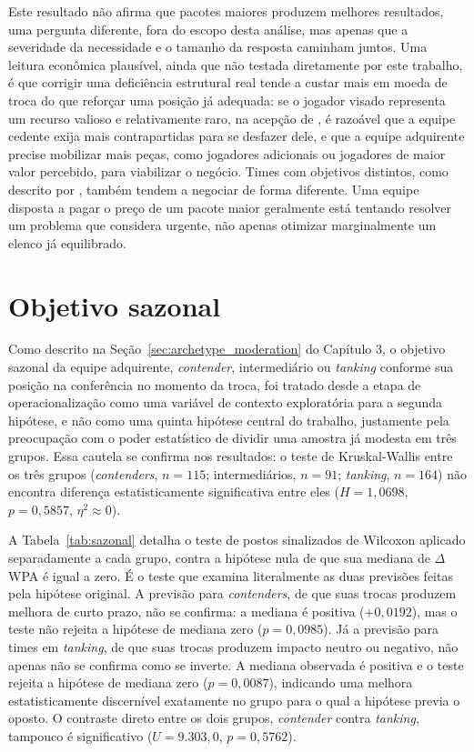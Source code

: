 Este resultado não afirma que pacotes maiores produzem melhores resultados, uma pergunta diferente, fora do escopo desta análise, mas apenas que a severidade da necessidade e o tamanho da resposta caminham juntos. Uma leitura econômica plausível, ainda que não testada diretamente por este trabalho, é que corrigir uma deficiência estrutural real tende a custar mais em moeda de troca do que reforçar uma posição já adequada: se o jogador visado representa um recurso valioso e relativamente raro, na acepção de \citet{barney1991}, é razoável que a equipe cedente exija mais contrapartidas para se desfazer dele, e que a equipe adquirente precise mobilizar mais peças, como jogadores adicionais ou jogadores de maior valor percebido, para viabilizar o negócio. Times com objetivos distintos, como descrito por \citet{zimbalist2003}, também tendem a negociar de forma diferente. Uma equipe disposta a pagar o preço de um pacote maior geralmente está tentando resolver um problema que considera urgente, não apenas otimizar marginalmente um elenco já equilibrado.

\section{Objetivo sazonal}
\label{sec:r_context}

Como descrito na Seção~\ref{sec:archetype_moderation} do Capítulo 3, o objetivo sazonal da equipe adquirente, \textit{contender}, intermediário ou \textit{tanking} conforme sua posição na conferência no momento da troca, foi tratado desde a etapa de operacionalização como uma variável de contexto exploratória para a segunda hipótese, e não como uma quinta hipótese central do trabalho, justamente pela preocupação com o poder estatístico de dividir uma amostra já modesta em três grupos. Essa cautela se confirma nos resultados: o teste de Kruskal-Wallis entre os três grupos (\textit{contenders}, $n=115$; intermediários, $n=91$; \textit{tanking}, $n=164$) não encontra diferença estatisticamente significativa entre eles ($H = 1{,}0698$, $p = 0{,}5857$, $\eta^2 \approx 0$).

A Tabela~\ref{tab:sazonal} detalha o teste de postos sinalizados de Wilcoxon aplicado separadamente a cada grupo, contra a hipótese nula de que sua mediana de $\Delta$WPA é igual a zero. É o teste que examina literalmente as duas previsões feitas pela hipótese original. A previsão para \textit{contenders}, de que suas trocas produzem melhora de curto prazo, não se confirma: a mediana é positiva ($+0{,}0192$), mas o teste não rejeita a hipótese de mediana zero ($p = 0{,}0985$). Já a previsão para times em \textit{tanking}, de que suas trocas produzem impacto neutro ou negativo, não apenas não se confirma como se inverte. A mediana observada é positiva e o teste rejeita a hipótese de mediana zero ($p = 0{,}0087$), indicando uma melhora estatisticamente discernível exatamente no grupo para o qual a hipótese previa o oposto. O contraste direto entre os dois grupos, \textit{contender} contra \textit{tanking}, tampouco é significativo ($U = 9.303{,}0$, $p = 0{,}5762$).

